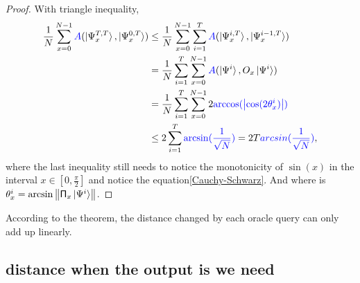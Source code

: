 \documentclass[a4paper,10pt]{article}
\numberwithin{equation}{subsection}
\begin{document}
\begin{proof}
    With triangle inequality,
    \begin{equation}
        \begin{split}
            \frac{1}{N}\sum_{x=0}^{N-1}\textcolor{blue}{A}(\ket{\Psi_{x}^{T,T}},\ket{\Psi_{x}^{0,T}})
             & \leq \frac{1}{N}\sum_{x=0}^{N-1}\sum_{i=1}^{T}\textcolor{blue}{A}(\ket{\Psi_{x}^{i,T}},\ket{\Psi_{x}^{i-1,T}})      \\
             & = \frac{1}{N}\sum_{i=1}^{T}\sum_{x=0}^{N-1}\textcolor{blue}{A}(\ket{\Psi^{i}},O_{x}\ket{\Psi^{i}})                  \\
             & = \frac{1}{N}\sum_{i=1}^{T}\sum_{x=0}^{N-1}2\textcolor{blue}{\arccos(\left\lvert\cos(2\theta_{x}^{i})\right\rvert)} \\
             & \leq 2\sum_{i=1}^{T}\textcolor{blue}{\arcsin(\frac{1}{\sqrt{N}})} = 2T\textcolor{blue}{arcsin(\frac{1}{\sqrt{N}})},
        \end{split}
    \end{equation}
    where the last inequality still needs to notice the monotonicity of $\sin(x)$ in the interval $x\in\left[0,\frac{\pi}{2}\right]$ and notice the equation\ref{Cauchy-Schwarz}. And where is $\theta_{x}^{i}=\arcsin\left\| \mathsf{\Pi}_{x}\ket{\Psi^{i}}\right\|$.
\end{proof}
According to the theorem, the distance changed by each oracle query can only add up linearly.



\subsection{distance when the output is we need}









\end{document}
